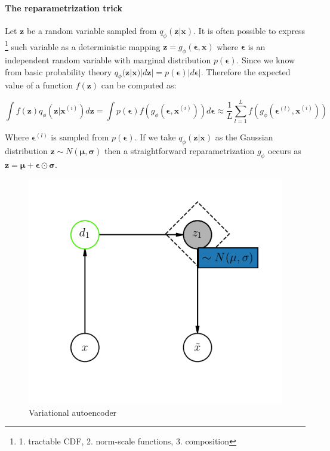 \documentclass[12pt, english]{article}
\begin{document}
\vspace{4mm}

\paragraph{The reparametrization trick \newline \newline}

\vspace{4mm}

\par Let $\bm{z}$ be a random variable sampled from $   q_{\phi}(\bm{z} | \bm{x})$. It is often possible to express \footnote{1. tractable CDF, 2. norm-scale functions, 3. composition} such variable as a deterministic mapping $\bm{z} = g_{\phi}(\bm{\epsilon}, \bm{x})$ where $\bm{\epsilon}$ is an independent random variable with marginal distribution $p(\bm{\epsilon})$. Since we know from basic probability theory $q_{\phi}(\bm{z} | \bm{x})|d\bm{z}| = p(\bm{\epsilon})|d\bm{\epsilon}|$. Therefore the expected value of a function $f(\bm{z})$ can be computed as:

\vspace{4mm}

\begin{equation}
    \int f(\bm{z})q_{\phi}(\bm{z} | \bm{x}^{(i)})d\bm{z} = \int p(\bm{\epsilon})f(g_{\phi}(\bm{\epsilon}, \bm{x}^{(i)})) d\bm{\epsilon} \approx \frac{1}{L}\sum_{l=1}^{L}f(g_{\phi}(\bm{\epsilon}^{(l)}, \bm{x}^{(i)}))
\end{equation}

\vspace{4mm}

\par Where $\bm{\epsilon}^{(l)}$ is sampled from $p(\bm{\epsilon})$. If we take $q_{\phi}(\bm{z} | \bm{x})$ as the Gaussian distribution $\bm{z} \sim N(\bm{\mu}, \bm{\sigma})$ then a straightforward reparametrization $g_{\phi}$ occurs as $\bm{z} = \bm{\mu} + \bm{\epsilon} \odot \bm{\sigma}$.

\vspace{4mm}

\begin{figure}[H]
    \centering
    \includegraphics[width=0.33\linewidth]{vae.png}
    \caption{Variational autoencoder}
    \label{fig:vae}
\end{figure}
\end{document}
